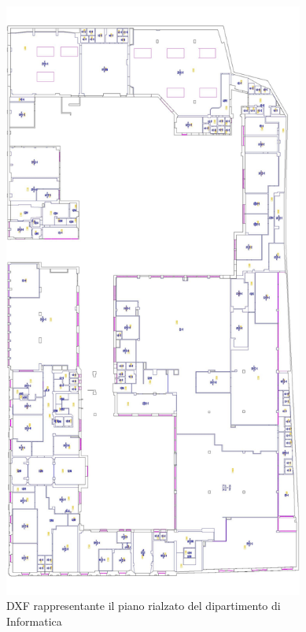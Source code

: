 \documentclass[12pt]{report}
\begin{document}
\begin{figure}[H]
    \centering
    \includegraphics[width=280pt]{Comelico-DXF.jpg}
    \caption{DXF rappresentante il piano rialzato del dipartimento di Informatica}
    \label{fig:Comelico-DXF}
\end{figure}
\end{document}
